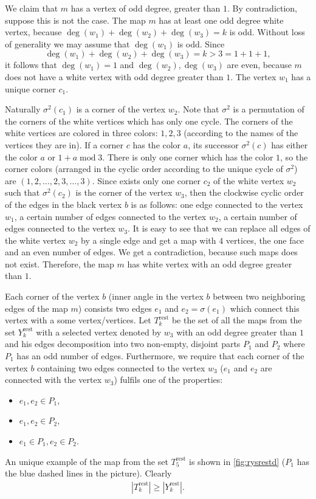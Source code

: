 \documentclass[submission]{FPSAC2021}
\DeclareMathOperator{\degg}{deg}
\DeclareMathOperator{\rest}{rest}
\newcommand{\nast}
{
	\sigma
}
\begin{document}
We claim that $m$ has a vertex of odd degree, greater than $1$. By contradiction,  suppose this is not the case. The map $m$ has at least one odd degree white vertex,
because $\degg(w_1)+\degg(w_2)+\degg(w_3)=k$ is odd. Without loss of generality we may assume that $\degg(w_1)$ is odd. Since $$\degg(w_1)+\degg(w_2)+\degg(w_3)=k>3=1+1+1,$$ %
it follows that $\degg(w_1)=1$ and $\degg(w_2),\degg(w_3)$ are even, because $m$
does not have a white vertex with odd degree greater than $1$. The vertex $w_1$
has a unique corner $c_1$.

Naturally $\nast^2(c_1)$ 
is a corner of the vertex $w_2$. 
Note that $\nast^2$ is a permutation of the corners of 
the white vertices which has only one cycle. 
The corners of the white vertices are colored in three colors: $1, 2, 3$
(according to the names of the vertices they are in).  
If a corner $c$ has the color $a$, 
its successor $\nast^2(c)$ has either the color $a$ or $1+a \operatorname{mod} 3$. 
There is only one corner which has the color $1$, so the corner colors 
(arranged in the cyclic order according to the unique cycle of $\nast^2$) are 
$(1, 2, \ldots, 2, 3, \ldots, 3)$.
Since exists only one corner $ c_2 $ of the white vertex $ w_2 $ such 
that $ \nast ^ 2 (c_2) $ is the corner of the vertex $ w_3 $, 
then the clockwise cyclic order of the edges in the black vertex $b$ is as
follows: one edge connected to the vertex $w_1$, a certain number of edges connected
to the vertex $w_2$, a certain number of edges connected to the vertex $w_3$.
It is easy to see that we can replace all edges of the white vertex $w_2$ by a
single edge and get a map with $4$ vertices, the one face and an even number of
edges. We get a contradiction, because such maps does not exist. Therefore, the
map $m$ has white vertex with an odd degree greater than $1$.

Each corner of the vertex $b$ (inner angle in the vertex $b$ between 
two neighboring edges of the map $m$) consists two edges $e_1$ and $e_2=\nast(e_1)$
which connect this vertex with a some vertex/vertices. Let $T_k^{\rest}$
be the set of all the maps from the set $Y_k^{\rest}$ with a selected vertex
denoted by $w_3$ with an odd degree greater than $1$ and his edges decomposition into
two non-empty, disjoint parts $P_1$ and $P_2$ where $P_1$ has an odd
number of edges. Furthermore, we require that each corner 
of the vertex $b$ containing two edges connected to the vertex $w_3$ 
($e_1$ and $e_2$ are connected with the vertex $w_3$)
fulfils one of the properties:
\begin{itemize}
\item $e_1, e_2 \in P_1$,
\item $e_1, e_2 \in P_2$, 
\item $e_1 \in P_1, e_2 \in P_2$. 
\end{itemize}  
An unique example of the map from the set $T_{5}^{\rest}$ is shown in
\cref{fig:rysrestd} ($P_1$ has the blue dashed lines in the picture).
Clearly
\begin{align}
\label{ineqrest}
|T_{k}^{\rest}| \geq |Y_{k}^{\rest}|.
\end{align}
\end{document}

